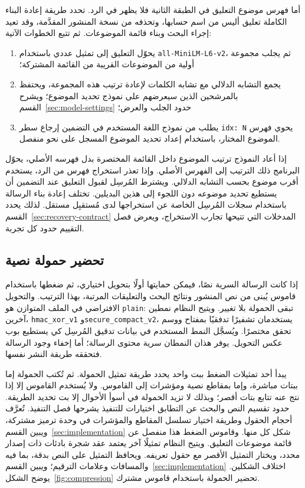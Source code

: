 أما فهرس موضوع التعليق في الطبقة الثانية فلا يظهر في الرد.
تحدد طريقة إعادة البناء الكاملة تعليق أليس من اسم حسابها، وتحذفه من نسخة المنشور المقدَّمة، وقد تعيد إجراء البحث وبناء قائمة الموضوعات. ثم تتبع الخطوات الآتية:
\begin{enumerate}
    \item يحوّل التعليق إلى تمثيل عددي باستخدام \texttt{all-MiniLM-L6-v2}، ثم يجلب مجموعة أولية من الموضوعات القريبة من القائمة المشتركة؛
    \item يجمع التشابه الدلالي مع تشابه الكلمات لإعادة ترتيب هذه المجموعة، ويحتفظ بالمرشحين الذين سيعرضهم على نموذج تحديد الموضوع؛ ويشرح القسم~\ref{sec:model-settings} حدود الجلب والعرض؛
    \item يطلب من نموذج اللغة المستخدم في التضمين إرجاع سطر \texttt{idx: N} يحوي فهرس الموضوع المختار، باستخدام إعداد تحديد الموضوع المسجل على نحو منفصل.
\end{enumerate}
إذا أعاد النموذج ترتيب الموضوع داخل القائمة المختصرة بدل فهرسه الأصلي، يحوّل البرنامج ذلك الترتيب إلى الفهرس الأصلي.
وإذا تعذر استخراج فهرس من الرد، يستخدم أقرب موضوع بحسب التشابه الدلالي.
ويشترط المُرسِل لقبول التعليق عند التضمين أن يستطيع تحديد موضوعه دون اللجوء إلى هذين البديلين.
تختلف إعادة بناء الرسالة باستخدام سجلات المُرسِل الخاصة عن استخراجها لدى مُستقبِل مستقل. لذلك يحدد القسم~\ref{sec:recovery-contract} المدخلات التي تتيحها تجارب الاستخراج، ويعرض فصل التقييم حدود كل تجربة.

\subsection{تحضير حمولة نصية}
\label{sec:compression}
إذا كانت الرسالة السرية نصًا، فيمكن حمايتها أولًا بتحويل اختياري، ثم ضغطها باستخدام قاموس يُبنى من نص المنشور ونتائج البحث والتعليقات المرتبة، بهذا الترتيب.
والتحويل الافتراضي في الملف المتوازن هو \texttt{plain}: تبقى الحمولة بلا تغيير.
ويتيح النظام نمطين آخرين، \texttt{hmac\_xor\_v1} و\texttt{secure\_compact\_v2}، يستخدمان تشفيرًا تدفقيًا بمفتاح ووسم تحقق  مختصرًا. ويُسجَّل النمط المستخدم في بيانات تدقيق المُرسِل كي يستطيع بوب عكس التحويل.
يوفر هذان النمطان سرية محتوى الرسالة؛ أما إخفاء وجود الرسالة فتحققه طريقة النشر نفسها.

يبدأ أحد تمثيلات الضغط ببت واحد يحدد طريقة تمثيل الحمولة. ثم تُكتب الحمولة إما ببتات  مباشرة، وإما بمقاطع نصية ومؤشرات إلى القاموس.
ولا يُستخدم القاموس إلا إذا نتج عنه تتابع بتات أقصر؛ وبذلك لا تزيد الحمولة في أسوأ الأحوال إلا بت تحديد الطريقة.
حدود تقسيم النص والبحث عن التطابق اختيارات للتنفيذ يشرحها فصل التنفيذ.
تُعرَّف أحجام الحقول وطريقة اختيار تسلسل المقاطع والمؤشرات في وحدة ترميز مشتركة، ويبين القسم~\ref{sec:implementation} شكل كل منها.
وقاموس الضغط هذا منفصل عن قائمة موضوعات التعليق.
ويتيح النظام تمثيلًا آخر يعتمد عقد شجرة بادئات ذات إصدار محدد، ويختار التمثيل الأقصر مع حقول تعريفه. ويحافظ التمثيل على النص بدقة، بما فيه  والمسافات وعلامات الترقيم؛ ويبين القسم~\ref{sec:implementation} اختلاف الشكلين.
يوضح الشكل~\ref{fig:compression} تحضير الحمولة باستخدام قاموس مشترك.

